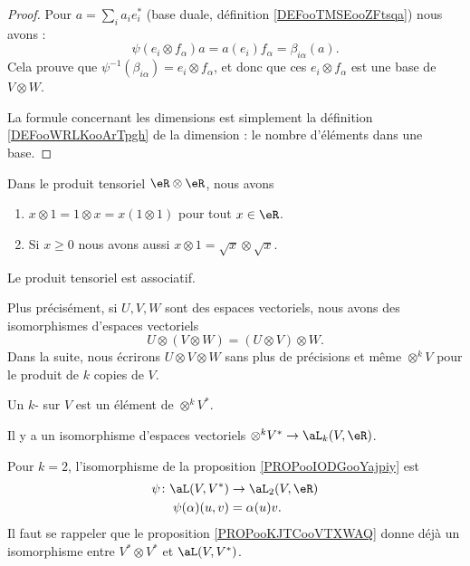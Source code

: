 \begin{proof}
	Pour \( a=\sum_ia_ie_i^*\) (base duale, définition \ref{DEFooTMSEooZFtsqa}) nous avons :
	\begin{equation}
		\psi(e_i\otimes f_{\alpha})a=a(e_i)f_{\alpha}=\beta_{i\alpha}(a).
	\end{equation}
	Cela prouve que \( \psi^{-1}(\beta_{i\alpha})=e_i\otimes f_{\alpha}\), et donc que ces \( e_i\otimes f_{\alpha}\) est une base de \( V\otimes W\).

	La formule concernant les dimensions est simplement la définition \ref{DEFooWRLKooArTpgh} de la dimension : le nombre d'éléments dans une base.
\end{proof}

\begin{lemma}       \label{LEMooYJIQooRCkHMq}
	Dans le produit tensoriel \( \eR\otimes \eR\), nous avons
	\begin{enumerate}
		\item
		      \( x\otimes 1=1\otimes x=x(1\otimes 1)\) pour tout \( x\in \eR\).
		\item
		      Si \( x\geq 0\) nous avons aussi \( x\otimes 1=\sqrt{ x }\otimes \sqrt{ x }\).
	\end{enumerate}
\end{lemma}

\begin{lemma}		\label{LEMooKPWNooNjkAru}
	Le produit tensoriel est associatif.

	Plus précisément, si \( U,V,W\) sont des espaces vectoriels, nous avons des isomorphismes d'espaces vectoriels
	\begin{equation}
		U\otimes(V\otimes W)=(U\otimes V)\otimes W.
	\end{equation}
	Dans la suite, nous écrirons \( U\otimes V\otimes W\) sans plus de précisions et même \( \otimes^kV\) pour le produit de \( k\) copies de \( V\).
\end{lemma}

\begin{definition}
	Un \( k\)- sur \( V\) est un élément de \( \otimes^kV^*\).
\end{definition}

\begin{proposition}		\label{PROPooIODGooYajpiy}
	Il y a un isomorphisme d'espaces vectoriels \( \otimes^kV^*\to \aL_k(V,\eR)\).
\end{proposition}

\begin{example}
	Pour \( k=2\), l'isomorphisme de la proposition \ref{PROPooIODGooYajpiy} est
	\begin{equation}
		\begin{aligned}
			\psi\colon \aL(V,V^*) & \to \aL_2(V,\eR) \\
			\psi(\alpha)(u,v)     & =\alpha(u)v.
		\end{aligned}
	\end{equation}
	Il faut se rappeler que le proposition \ref{PROPooKJTCooVTXWAQ} donne déjà un isomorphisme entre \( V^*\otimes V^*\) et \( \aL(V,V^*)\).
\end{example}


